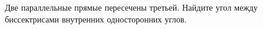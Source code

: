 \begin{ex}
	\begin{condition}
		Две параллельные прямые пересечены третьей. Найдите угол между биссектрисами внутренних односторонних углов.
	\end{condition}
	\answer{\( 90\degree \)}
\end{ex}